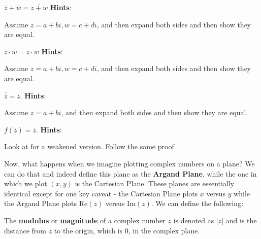 \documentclass[11pt,titlepage]{scrartcl}
\newenvironment{hint}{\footnotesize \normalfont \textbf{Hints}:}{\hspace{-0.5ex}}
\begin{document}
\begin{exercisebox}
\begin{exercise}\label{ca}
$\overline z+\overline w=\overline{z+w}$
\begin{hint}
\begin{addhint}{
Assume $z=a+bi,w=c+di$, and then expand both sides and then show they are equal.
}\end{addhint}
\end{hint}
\end{exercise}
\begin{exercise}\label{cm}
$\overline z\cdot\overline w=\overline{z\cdot w}$
\begin{hint}
\begin{addhint}{
Assume $z=a+bi,w=c+di$, and then expand both sides and then show they are equal.
}\end{addhint}
\end{hint}
\end{exercise}
\begin{exercise}
$\overline{\overline z}=z$.
\begin{hint}
\begin{addhint}{
Assume $z=a+bi$, and then expand both sides and then show they are equal.
}\end{addhint}
\end{hint}
\end{exercise}
\begin{exercise}
$f(\overline z)=\overline z$.
\begin{hint}
\begin{addhint}{
Look at  for a weakened version. Follow the same proof.
}\end{addhint}
\end{hint}
\end{exercise}
\end{exercisebox}
Now, what happens when we imagine plotting complex numbers on a plane? We can do that and indeed define this plane as the \textbf{Argand Plane}, while the one in which we plot $(x,y)$ is the Cartesian Plane. These planes are essentially identical except for one key caveat - the Cartesian Plane plots $x$ versus $y$ while the Argand Plane plots $\text{Re}(z)$ versus $\text{Im}(z)$. We can define the following:
\begin{defn}
The \textbf{modulus} or \textbf{magnitude} of a complex number $z$ is denoted as $|z|$ and is the distance from $z$ to the origin, which is 0, in the complex plane.
\end{defn}
\end{document}
